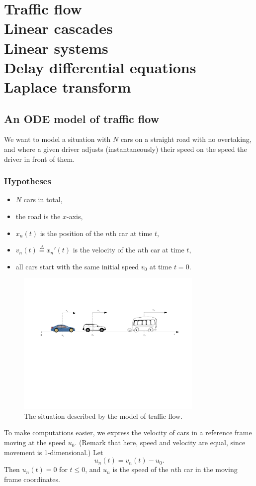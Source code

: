 \chapter[Traffic flow]{Traffic flow\\[0.5cm] Linear cascades\\ Linear systems\\
Delay differential equations\\ Laplace transform}
\label{chap:traffic_flow}



\section{An ODE model of traffic flow}

We want to model a situation with $N$ cars on a straight road with no overtaking, and where a given driver adjusts (instantaneously) their speed on the speed the driver in front of them.
\subsection{Hypotheses}
\begin{itemize}
\item $N$ cars in total,
\item the road is the $x$-axis,
\item $x_n(t)$ is the position of the $n$th car at time $t$,
\item $v_n(t)\stackrel{\Delta}{=}x_n'(t)$ is the velocity of the $n$th car at time $t$,
\item all cars start with the same initial speed $v_0$ at time $t=0$.
\end{itemize}
\begin{figure}[htbp]
\begin{center}
\includegraphics[width=0.8\textwidth]{../figs_06_traffic_flow/traffic_flow1}
\caption{The situation described by the model of traffic flow.}
\label{fig:traffic_flow_ODEmodel}
\end{center}
\end{figure}
To make computations easier, we express the velocity of cars in a reference frame
moving at the speed $u_0$. (Remark that here, speed and velocity are equal, since movement is 1-dimensional.)
Let
\[
u_n(t)=v_n(t)-u_0.
\]
Then $u_n(t)=0$ for $t\leq 0$, and $u_n$ is the speed of the $n$th car in the moving frame coordinates.


